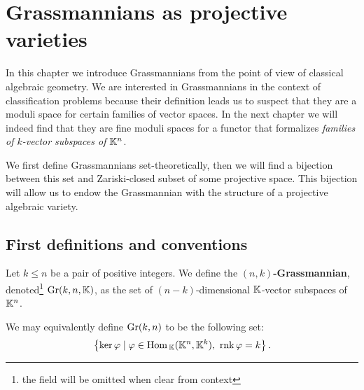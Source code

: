 \chapter{Grassmannians as projective varieties}
In this chapter we introduce Grassmannians from the point of view of classical algebraic geometry. We are interested in Grassmannians in the context of classification problems because their definition leads us to suspect that they are a moduli space for certain families of vector spaces. In the next chapter we will indeed find that they are fine moduli spaces for a functor that formalizes \textit{families of $k$-vector subspaces of $\mathbb{K}^n$}.\medskip

We first define Grassmannians set-theoretically, then we will find a bijection between this set and Zariski-closed subset of some projective space. This bijection will allow us to endow the Grassmannian with the structure of a projective algebraic variety.

\section{First definitions and conventions}
\begin{definition}[Grassmannian]
Let $k\leq n$ be a pair of positive integers. We define the \textbf{$(n,k)$-Grassmannian}, denoted\footnote{the field will be omitted when clear from context} $\mathrm{Gr}(k,n,\mathbb{K})$, as the set of $(n-k)$-dimensional $\mathbb{K}$-vector subspaces of $\mathbb{K}^n$.
\end{definition}

\begin{remark}
We may equivalently define $\mathrm{Gr}(k,n)$ to be the following set:
\[\cpa{\ker \vp\mid \vp\in \Hom_\K(\K^n,\K^k),\ \rnk \vp=k}.\]
\end{remark}


